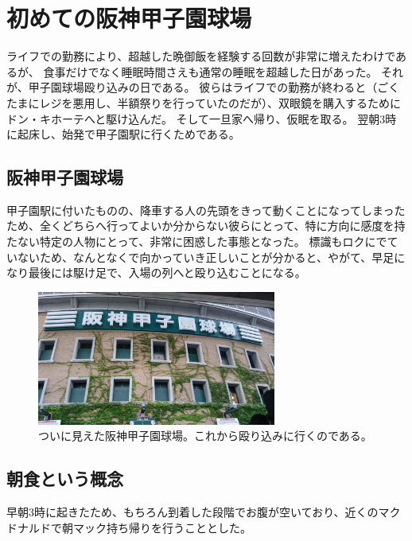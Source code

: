 \section{初めての阪神甲子園球場}
ライフでの勤務により、超越した晩御飯を経験する回数が非常に増えたわけであるが、
食事だけでなく睡眠時間さえも通常の睡眠を超越した日があった。
それが、甲子園球場殴り込みの日である。
彼らはライフでの勤務が終わると（ごくたまにレジを悪用し、半額祭りを行っていたのだが）、双眼鏡を購入するためにドン・キホーテへと駆け込んだ。
そして一旦家へ帰り、仮眠を取る。
翌朝3時に起床し、始発で甲子園駅に行くためである。

\subsection{阪神甲子園球場}
甲子園駅に付いたものの、降車する人の先頭をきって動くことになってしまったため、全くどちらへ行ってよいか分からない彼らにとって、特に方向に感度を持たない特定の人物にとって、非常に困惑した事態となった。
標識もロクにでていないため、なんとなくで向かっていき正しいことが分かると、やがて、早足になり最後には駆け足で、入場の列へと殴り込むことになる。

\begin{figure}[h]
\centering
\includegraphics[width=0.7\textwidth]{./section/Shokuji/figures/Koushien_1.jpg}
  \caption{ついに見えた阪神甲子園球場。これから殴り込みに行くのである。}
\label{Fig:Seiza}
\end{figure}



\subsection{朝食という概念}
早朝3時に起きたため、もちろん到着した段階でお腹が空いており、近くのマクドナルドで朝マック持ち帰りを行うこととした。


